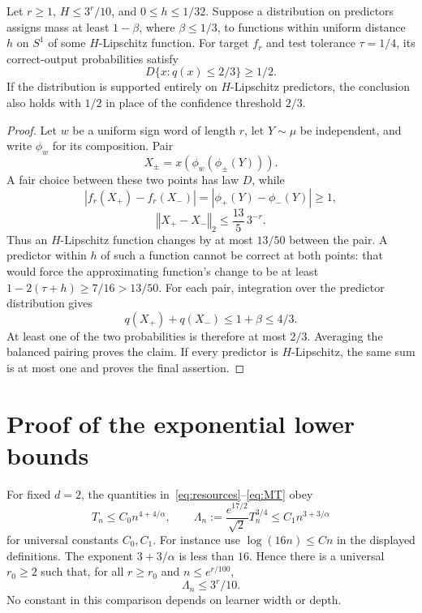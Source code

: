 \documentclass[11pt]{article}
\theoremstyle{remark}\newtheorem{remark}[theorem]{Remark}
\newcommand{\norm}[1]{\left\Vert#1\right\Vert}
\begin{document}
\begin{lemma}
\label{lem:pairing}
Let $r\ge1$, $H\le3^r/10$, and $0\le h\le1/32$.
Suppose a distribution on predictors assigns mass at least $1-\beta$,
where $\beta\le1/3$, to functions within uniform distance $h$ on $S^1$
of some $H$-Lipschitz function. For target $f_r$ and test tolerance
$\tau=1/4$, its correct-output probabilities satisfy
\[
 D\{x:q(x)\le2/3\}\ge1/2.
\]
If the distribution is supported entirely on $H$-Lipschitz predictors,
the conclusion also holds with $1/2$ in place of the confidence
threshold $2/3$.
\end{lemma}
\begin{proof}
Let $w$ be a uniform sign word of length $r$, let $Y\sim\mu$ be
independent, and write $\phi_w$ for its composition. Pair
\[
 X_\pm=x(\phi_w(\phi_\pm(Y))).
\]
A fair choice between these two points has law $D$, while
\[
 |f_r(X_+)-f_r(X_-)|=|\phi_+(Y)-\phi_-(Y)|\ge1,
\]
\begin{equation}\label{eq:pair-gap}
 \norm{X_+-X_-}_2\le\frac{13}{5}\,3^{-r}.
\end{equation}
Thus an $H$-Lipschitz function changes by at most $13/50$ between
the pair. A predictor within $h$ of such a function cannot be correct
at both points: that would force the approximating function's change
to be at least $1-2(\tau+h)\ge7/16>13/50$.
For each pair, integration over the predictor distribution gives
\[
 q(X_+)+q(X_-)\le1+\beta\le4/3.
\]
At least one of the two probabilities is therefore at most $2/3$.
Averaging the balanced pairing proves the claim. If every predictor
is $H$-Lipschitz, the same sum is at most one and proves the final
assertion.
\end{proof}




\section{Proof of the exponential lower bounds}\label{sec:proof}
For fixed $d=2$, the quantities in~\eqref{eq:resources}--\eqref{eq:MT}
obey
\[
 T_n\le C_0 n^{4+4/\alpha},\qquad
 \Lambda_n:=\frac{e^{17/2}}{\sqrt2}T_n^{3/4}
 \le C_1 n^{3+3/\alpha}
\]
for universal constants $C_0,C_1$. For instance use
$\log(16n)\le Cn$ in the displayed definitions. The exponent
$3+3/\alpha$ is less than $16$. Hence there is a universal $r_0\ge2$
such that, for all $r\ge r_0$ and $n\le e^{r/100}$,
\begin{equation}\label{eq:exp-comparison}
 \Lambda_n\le3^r/10.
\end{equation}
No constant in this comparison depends on learner width or depth.
\end{document}

